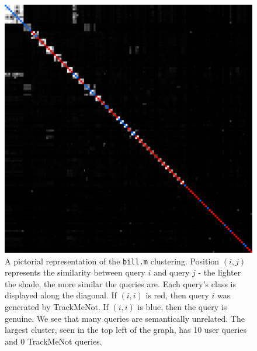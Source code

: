 \documentclass[11pt]{article}
\begin{document}
\begin{multicols}{2}
  \begin{figure}[h]
    \centering
    \includegraphics[width=\linewidth]{disco_bill_131}
    \caption{A pictorial representation of the \texttt{bill.m}
      clustering. Position $(i,j)$ represents the similarity between
      query $i$ and query $j$ - the lighter the shade, the more
      similar the queries are. Each query's class is displayed along
      the diagonal. If $(i,i)$ is red, then query $i$ was generated by
      TrackMeNot. If $(i,i)$ is blue, then the query is genuine. We
      see that many queries are semantically unrelated. The largest
      cluster, seen in the top left of the graph, has 10 user queries
      and 0 TrackMeNot queries.}
    \label{fig:disco.bill}
  \end{figure}


\end{multicols}
\end{document}

